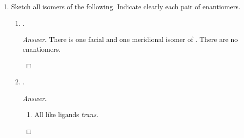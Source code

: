 \documentclass[../psets.tex]{subfiles}
\begin{document}
\begin{enumerate}[label={\Roman*)}]
\begin{enumerate}[label={\textbf{9.\arabic*}}]
\begin{enumerate}[label={\textbf{\alph*.}}]
\begin{proof}[Answer]
\begin{center}
                \end{center}
            \end{proof}
            \item Tri-$\mu$-carbonylbis(tricarbonyliron(0)).
            \begin{proof}[Answer]
                ${\color{white}hi}$
                \begin{center}
                \end{center}
            \end{proof}
        \end{enumerate}
        \newpage
        \setcounter{enumii}{11}
        \item Sketch all isomers of the following. Indicate clearly each pair of enantiomers.
        \begin{enumerate}[label={\textbf{\alph*.}}]
            \item \ce{[Pt(NH3)3Cl3]+}.
            \begin{proof}[Answer]
                There is one facial and one meridional isomer of \ce{[Pt(NH3)3Cl3]+}. There are no enantiomers.
                \begin{center}
                    \chemleft{[}
                    \chemright{]^+}
                    \hspace{3cm}
                    \chemleft{[}
                    \chemright{]^+}
                \end{center}
            \end{proof}
            \item \ce{[Co(NH3)2(H2O)2Cl2]+}.
            \begin{proof}[Answer]\leavevmode
                \begin{enumerate}[label={\arabic*.}]
                    \item All like ligands \emph{trans}.
                    \begin{center}
                        \chemleft{[}
                        \chemright{]^+}

\end{center}
\end{enumerate}
\end{proof}
\end{enumerate}
\end{enumerate}
\end{enumerate}
\end{document}

